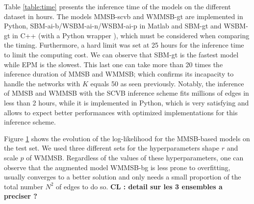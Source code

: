 \begin{table*}[t]
\centering
	
\label{table:time}
\end{table*}
Table \ref{table:time} presents the inference time of the models on the different dataset in hours. The models MMSB-scvb and WMMSB-gt are implemented in Python, SBM-ai-b/WSBM-ai-n/WSBM-ai-p in Matlab and SBM-gt and WSBM-gt in C++ (with a Python wrapper \cite{peixoto_graph-tool_2014}), which must be considered when comparing the timing. Furthermore, a hard limit  was set at 25 hours for the inference time to limit the computing cost. We can observe that SBM-gt is the fastest model while EPM is the slowest. This last one can take more than 20 times the inference duration of MMSB and WMMSB; which confirms its incapacity to handle the networks with $K$ equals 50 as seen previously. Notably, the inference of MMSB and WMMSB with the SCVB inference scheme fits millions of edges in less than 2 hours, while it is implemented in Python, which is very satisfying and allows to expect better performances  with optimized implementations for this inference scheme.



Figure \ref{fig:conv_entropy} shows the evolution of the log-likelihood for the MMSB-based models on the test set. We used three different sets for the hyperparameters shape $r$ and scale $p$ of WMMSB. Regardless of the values of these hyperparameters, one can observe that the augmented model WMMSB-bg is less prone to overfitting, usually converges to a better solution and only needs a small proportion of the total number $N^2$ of edges to do so.
\textbf{CL : detail sur les 3 ensembles a preciser ?} 

\begin{figure}[h]
\centering
	
    \label{fig:conv_entropy}
\end{figure}







